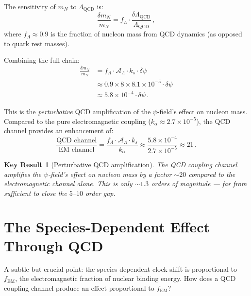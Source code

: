 \documentclass[aps,prd,twocolumn,superscriptaddress,floatfix,nofootinbib]{revtex4-2}
\newcommand{\LQCD}{\Lambda_{\mathrm{QCD}}}
\newcommand{\fEM}{f_{\mathrm{EM}}}
\newcommand{\mN}{m_N}
\newtheorem{result}{Key Result}
\begin{document}
The sensitivity of $\mN$ to $\LQCD$ is:
\begin{equation}
\frac{\delta\mN}{\mN} = f_\Lambda \cdot \frac{\delta\LQCD}{\LQCD} \, ,
\label{eq:mN_sensitivity}
\end{equation}
where $f_\Lambda \approx 0.9$ is the fraction of nucleon mass from QCD dynamics
(as opposed to quark rest masses).

Combining the full chain:
\begin{align}
\frac{\delta\mN}{\mN} &= f_\Lambda \cdot \mathcal{A}_\Lambda \cdot k_s \cdot
\delta\psi \nonumber \\
&\approx 0.9 \times 8 \times 8.1 \times 10^{-5} \cdot \delta\psi \nonumber \\
&\approx 5.8 \times 10^{-4} \cdot \delta\psi \, .
\label{eq:full_chain}
\end{align}

This is the \emph{perturbative} QCD amplification of the $\psi$-field's effect
on nucleon mass. Compared to the pure electromagnetic coupling ($k_\alpha \approx
2.7 \times 10^{-5}$), the QCD channel provides an enhancement of:
\begin{equation}
\frac{\text{QCD channel}}{\text{EM channel}} = \frac{f_\Lambda \cdot
\mathcal{A}_\Lambda \cdot k_s}{k_\alpha} \approx \frac{5.8 \times 10^{-4}}{2.7
\times 10^{-5}} \approx 21 \, .
\label{eq:qcd_em_ratio}
\end{equation}

\begin{result}[Perturbative QCD amplification]
The QCD coupling channel amplifies the $\psi$-field's effect on nucleon mass by
a factor $\sim 20$ compared to the electromagnetic channel alone. This is only
$\sim 1.3$ orders of magnitude --- far from sufficient to close the $5$--$10$
order gap.
\end{result}


\section{The Species-Dependent Effect Through QCD}
\label{sec:species_dep}

A subtle but crucial point: the species-dependent clock shift is proportional to
$\fEM$, the electromagnetic fraction of nuclear binding energy. How does a QCD
coupling channel produce an effect proportional to $\fEM$?
\end{document}
